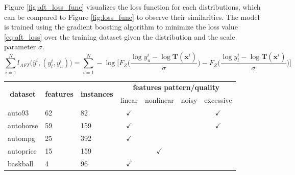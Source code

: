 \documentclass[12pt]{article}
\begin{document}
Figure \ref{fig:aft_loss_func} visualizes the loss function for each distributions, which can be compared to Figure \ref{fig:loss_func} to observe their similarities. 
The model is trained using the gradient boosting algorithm \citep{gradient_boosting} to minimize the loss value \eqref{eq:aft_loss} over the training dataset given the distribution and the scale parameter $\sigma$.
\begin{equation*}
    \sum_{i = 1}^N l_{AFT}\Big(\hat{y}^i, (y_l^i, y_u^i)\Big) = \sum_{i=1}^N -\log \Big[ F_Z\big( \frac{\log y_u^i - \log\mathbf{T}(\mathbf{x}^i)}{\sigma} \big) - F_Z\big(\frac{\log y_l^i - \log\mathbf{T}(\mathbf{x}^i)}{\sigma}\big) \Big]
\end{equation*}

\begin{table}[!t]
\centering
\footnotesize
\begin{tabular}{l|l|l|c|c|c|c}
\multicolumn{1}{c|}{\multirow{2}{*}{\textbf{dataset}}} & \multicolumn{1}{c|}{\multirow{2}{*}{\textbf{features}}} & \multicolumn{1}{c|}{\multirow{2}{*}{\textbf{instances}}} & \multicolumn{4}{c}{\textbf{features pattern/quality}} \\
\multicolumn{1}{c|}{}                         & \multicolumn{1}{c|}{}                          & \multicolumn{1}{c|}{}                           & linear   & nonlinear  & noisy  & excessive  \\ \midrule
auto93                                       & 62                                            & 82                                             &$\checkmark$       &            &        &$\checkmark$         \\
autohorse                                    & 59                                            & 159                                            &$\checkmark$       &            &        &$\checkmark$         \\
autompg                                      & 25                                            & 392                                            &$\checkmark$       &            &        &            \\
autoprice                                    & 15                                            & 159                                            &          &$\checkmark$         &        &            \\
baskball                                     & 4                                             & 96                                             &$\checkmark$       &            &        &            \\

\end{tabular}
\end{table}
\end{document}
